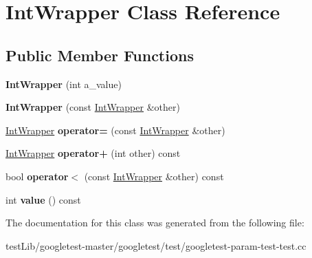 \hypertarget{classIntWrapper}{}\section{Int\+Wrapper Class Reference}
\label{classIntWrapper}
\subsection*{Public Member Functions}
\begin{DoxyCompactItemize}
\item 
\mbox{\label{classIntWrapper_a1d35e0d0b9c0fc109a8d2a2118ae6010}} 
{\bfseries Int\+Wrapper} (int a\+\_\+value)
\item 
\mbox{\label{classIntWrapper_af23efe3c8d8bf176948922b41e8f253e}} 
{\bfseries Int\+Wrapper} (const \hyperlink{classIntWrapper}{Int\+Wrapper} \&other)
\item 
\mbox{\label{classIntWrapper_a39077b3c0eb1dd8a296a81bfb0a047b3}} 
\hyperlink{classIntWrapper}{Int\+Wrapper} {\bfseries operator=} (const \hyperlink{classIntWrapper}{Int\+Wrapper} \&other)
\item 
\mbox{\label{classIntWrapper_abf97bd11dd2825f3cb9e4d9f48152b56}} 
\hyperlink{classIntWrapper}{Int\+Wrapper} {\bfseries operator+} (int other) const
\item 
\mbox{\label{classIntWrapper_a940fd2978cdf7849281f11b32df94163}} 
bool {\bfseries operator$<$} (const \hyperlink{classIntWrapper}{Int\+Wrapper} \&other) const
\item 
\mbox{\label{classIntWrapper_a6103e9dc5eb94678985e3c2ac481b508}} 
int {\bfseries value} () const
\end{DoxyCompactItemize}


The documentation for this class was generated from the following file\+:\begin{DoxyCompactItemize}
\item 
test\+Lib/googletest-\/master/googletest/test/googletest-\/param-\/test-\/test.\+cc\end{DoxyCompactItemize}
